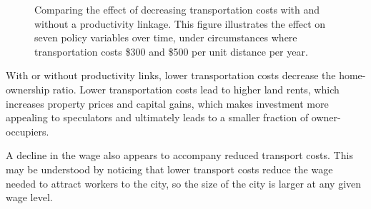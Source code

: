 \begin{figure}[h!tb]
\caption[Comparing the effect of decreasing transportation costs with and without a productivity linkage]{Comparing the effect of decreasing transportation costs with and without a productivity linkage. This figure illustrates the effect on seven policy variables over time,  under circumstances where transportation costs \$300 and \$500 per unit distance per year.}
\label{fig:Productivity_link_W-WO-transportation-cost}
\end{figure}
With or without productivity links, lower transportation costs decrease the home-ownership ratio. 
Lower transportation costs lead to higher land rents, which increases property prices and  capital gains, which makes investment more appealing to speculators and ultimately leads to a smaller fraction of owner-occupiers.

A decline in the wage also appears to accompany reduced transport costs. This may be understood by noticing that lower transport costs reduce the wage needed to attract workers to the city, so the size of the city is larger at any given wage level. %


